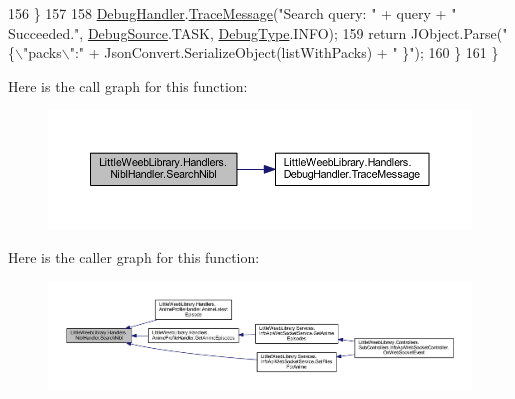 \begin{DoxyCode}
156                 \}
157 
158                 \mbox{\hyperlink{class_little_weeb_library_1_1_handlers_1_1_nibl_handler_a334c2111588fa71d1203bd8cbb572970}{DebugHandler}}.\mbox{\hyperlink{interface_little_weeb_library_1_1_handlers_1_1_i_debug_handler_a2e405bc3492e683cd3702fae125221bc}{TraceMessage}}(\textcolor{stringliteral}{"Search query: "} + query + \textcolor{stringliteral}{" Succeeded."},
       \mbox{\hyperlink{namespace_little_weeb_library_1_1_handlers_a2a6ca0775121c9c503d58aa254d292be}{DebugSource}}.TASK, \mbox{\hyperlink{namespace_little_weeb_library_1_1_handlers_ab66019ed40462876ec4e61bb3ccb0a62}{DebugType}}.INFO);
159                 \textcolor{keywordflow}{return} JObject.Parse(\textcolor{stringliteral}{"\{\(\backslash\)"packs\(\backslash\)":"} + JsonConvert.SerializeObject(listWithPacks) + \textcolor{stringliteral}{" \}"});
160             \}
161         \}
\end{DoxyCode}
Here is the call graph for this function\+:\nopagebreak
\begin{figure}[H]
\begin{center}
\leavevmode
\includegraphics[width=350pt]{class_little_weeb_library_1_1_handlers_1_1_nibl_handler_aa5fcae94d3322123b784078727a3db67_cgraph}
\end{center}
\end{figure}
Here is the caller graph for this function\+:\nopagebreak
\begin{figure}[H]
\begin{center}
\leavevmode
\includegraphics[width=350pt]{class_little_weeb_library_1_1_handlers_1_1_nibl_handler_aa5fcae94d3322123b784078727a3db67_icgraph}
\end{center}
\end{figure}
\mbox{\label{class_little_weeb_library_1_1_handlers_1_1_nibl_handler_acffe025c2b1158bc67196879622dfa0a}} 
